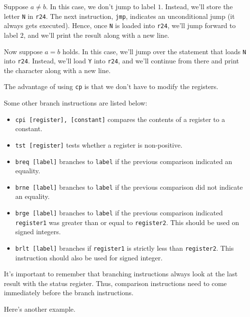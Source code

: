 Suppose $a \neq b$. In this case, we don't jump to label $1$. Instead, we'll store the letter \verb!N! in \verb!r24!. The next instruction, \verb!jmp!, indicates an unconditional jump (it always gets executed). Hence, once \verb!N! is loaded into \verb!r24!, we'll jump forward to label $2$, and we'll print the result along with a new line.


Now suppose $a = b$ holds. In this case, we'll jump over the statement that loads \verb!N! into \verb!r24!. Instead, we'll load \verb!Y! into \verb!r24!, and we'll continue from there and print the character along with a new line.


The advantage of using \verb!cp! is that we don't have to modify the registers.

Some other branch instructions are listed below: \begin{itemize}
    \item \verb!cpi [register], [constant]! compares the contents of a register to a constant.
    \item \verb!tst [register]! tests whether a register is non-positive.
    \item \verb!breq [label]! branches to \verb!label! if the previous comparison indicated an equality.
    \item \verb!brne [label]! branches to \verb!label! if the previous comparison did not indicate an equality.
    \item \verb!brge [label]! branches to \verb!label! if the previous comparison indicated \verb!register1! was greater than or equal to \verb!register2!. This should be used on signed integers.
    \item \verb!brlt [label]! branches if \verb!register1! is strictly less than \verb!register2!. This instruction should also be used for signed integer.
\end{itemize}

It's important to remember that branching instructions always look at the last result with the status register. Thus, comparison instructions need to come immediately before the branch instructions.


Here's another example.

\lstset{
caption=Assembly: Do-While Loop
}


